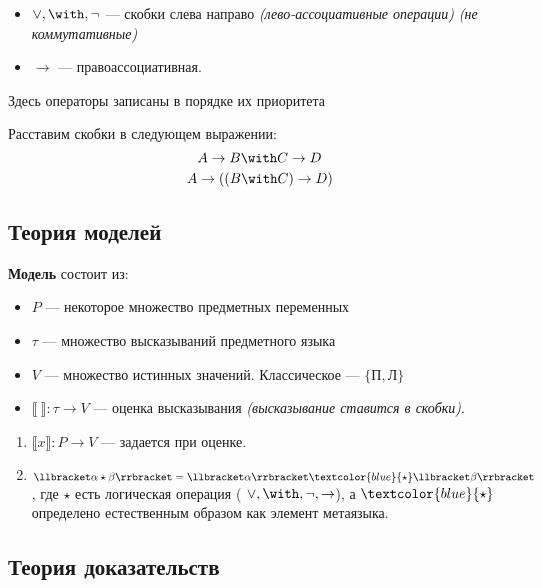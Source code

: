 \documentclass[12pt, a4paper, oneside]{book}
\begin{document}
\begin{itemize}
    \item \(\lor, \with, \neg\) --- скобки слева направо \textit{(лево-ассоциативные операции)} \textit{(не коммутативные)}
    \item \( \to \) --- правоассоциативная.
\end{itemize}

\begin{remark}
    Здесь операторы записаны в порядке их приоритета
\end{remark}

\begin{example}
    Расставим скобки в следующем выражении:
    \[A \to B \with C \to D\]
    \[A \to ((B \with C) \to D)\]
\end{example}

\subsection{Теория моделей}

\textbf{Модель} состоит из:
\begin{obozn}\itemfix
    \begin{itemize}
        \item \(P\) --- некоторое множество предметных переменных
        \item \(\tau\) --- множество высказываний предметного языка
        \item \(V\) --- множество истинных значений. Классическое --- \(\{\text{П}, \text{Л}\}\)
        \item \(\llbracket\ \rrbracket : \tau \to V\) --- оценка высказывания \textit{(высказывание ставится в скобки)}.
    \end{itemize}
\end{obozn}

\begin{enumerate}
    \item \(\llbracket x \rrbracket : P \to V\) --- задается при оценке. %
    \item \(\llbracket \alpha \star \beta \rrbracket = \llbracket \alpha \rrbracket \textcolor{blue}{\star} \llbracket \beta \rrbracket\), где \(\star\) есть логическая операция ( \(\lor, \with, \neg, \to\)), а \(\textcolor{blue}{\star}\) определено естественным образом как элемент метаязыка.
\end{enumerate}

\subsection{Теория доказательств}
\end{document}
